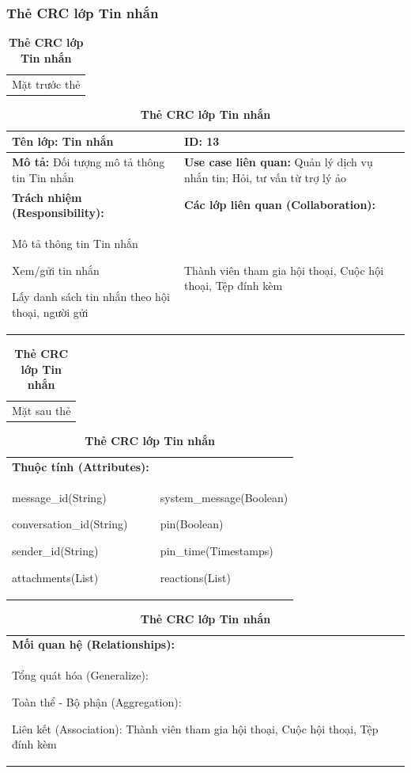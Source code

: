   \subsubsection{Thẻ CRC lớp Tin nhắn}
  \begin{table}[H]
    \caption{\bfseries \fontsize{12pt}{0pt}\selectfont Thẻ CRC lớp Tin nhắn}
    \centering
    \begin{tabularx}{0.9\textwidth}{X}
      Mặt trước thẻ
    \end{tabularx}
    \begin{tabularx}{0.9\textwidth}{|X|X|}
      \hline
      \textbf{Tên lớp:} Tin nhắn & \textbf{ID:} 13 \\
      \hline
      \textbf{Mô tả:} Đối tượng mô tả thông tin Tin nhắn & \textbf{Use case liên quan:} Quản lý dịch vụ nhắn tin; Hỏi, tư vấn từ trợ lý ảo \\
      \hline
      \textbf{Trách nhiệm (Responsibility):} & \textbf{Các lớp liên quan (Collaboration):} \\
      Mô tả thông tin Tin nhắn

      Xem/gửi tin nhắn

      Lấy danh sách tin nhắn theo hội thoại, người gửi
      & 
      Thành viên tham gia hội thoại, Cuộc hội thoại, Tệp đính kèm
      \\
      \hline
    \end{tabularx}
    \begin{tabularx}{0.9\textwidth}{X}
      Mặt sau thẻ
    \end{tabularx}
    \begin{tabularx}{0.9\textwidth}{|X|X|}
      \hline
      \textbf{Thuộc tính (Attributes):} & \\
      message\_id(String) 
      
      conversation\_id(String)

      sender\_id(String)

      attachments(List)
      &
      system\_message(Boolean)

      pin(Boolean)

      pin\_time(Timestamps)

      reactions(List)
      \\
      \hline
    \end{tabularx}
    \begin{tabularx}{0.9\textwidth}{|X|}
      \textbf{Mối quan hệ (Relationships):} \\
      Tổng quát hóa (Generalize):  

      Toàn thể - Bộ phận (Aggregation): 
      
      Liên kết (Association): Thành viên tham gia hội thoại, Cuộc hội thoại, Tệp đính kèm 
      \\
      \hline
    \end{tabularx}
  \end{table}

